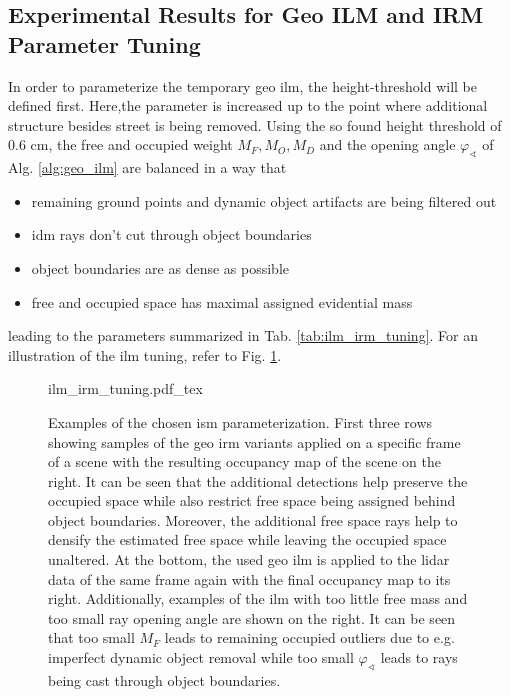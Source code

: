 \subsection{Experimental Results for Geo ILM and IRM Parameter Tuning}
\label{subsec:exp_results_params_ilm_irm}
In order to parameterize the temporary geo \gls{ilm}, the height-threshold will be defined first. Here,the parameter is increased up to the point where additional structure besides street is being removed. Using the so found height threshold of 0.6 cm, the free and occupied weight $M_F, M_O, M_D$ and the opening angle $\varphi_\sphericalangle$ of Alg. \ref{alg:geo_ilm} are balanced in a way that 
\begin{itemize}
	\item remaining ground points and dynamic object artifacts are being filtered out
	\item \gls{idm} rays don't cut through object boundaries
	\item object boundaries are as dense as possible
	\item free and occupied space has maximal assigned evidential mass
\end{itemize}
leading to the parameters summarized in Tab. \ref{tab:ilm_irm_tuning}. For an illustration of the \gls{ilm} tuning, refer to Fig. \ref{fig:ilm_irm_tuning}.
\begin{figure}[H]
	\begin{center}
		{ilm_irm_tuning.pdf_tex}
		\caption{\label{fig:ilm_irm_tuning}Examples of the chosen \gls{ism} parameterization. First three rows showing samples of the geo \gls{irm} variants applied on a specific frame of a scene with the resulting occupancy map of the scene on the right. It can be seen that the additional detections help preserve the occupied space while also restrict free space being assigned behind object boundaries. Moreover, the additional free space rays help to densify the estimated free space while leaving the occupied space unaltered. At the bottom, the used geo \gls{ilm} is applied to the lidar data of the same frame again with the final occupancy map to its right. Additionally, examples of the \gls{ilm} with too little free mass and too small ray opening angle are shown on the right. It can be seen that too small $M_F$ leads to remaining occupied outliers due to e.g. imperfect dynamic object removal while too small $\varphi_\sphericalangle$ leads to rays being cast through object boundaries.}
	\end{center}
\end{figure} 
